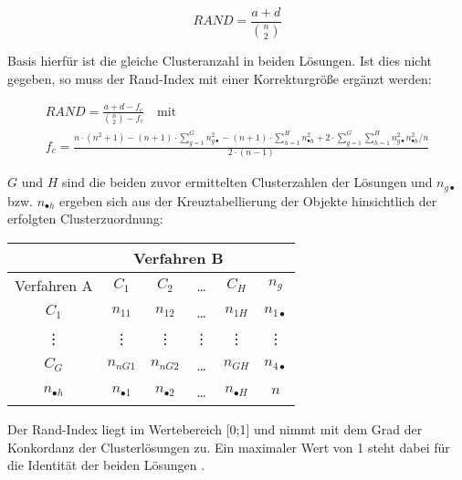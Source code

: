 \begin{equation}
RAND = \frac{a+d}{\binom{n}{2}}
\end{equation}

Basis hierfür ist die gleiche Clusteranzahl in beiden Lösungen. Ist dies nicht gegeben, so muss der Rand-Index mit einer Korrekturgröße ergänzt werden:

 \begin{gather}
 RAND = \frac{a+d-f_c}{\binom{n}{2}-f_c} \quad \text{mit} \\
 f_c = \frac{n\cdot(n^2+1)-(n+1)\cdot\sum_{g=1}^{G}n_{g \bullet}^2-(n+1)\cdot\sum_{h=1}^{H}n_{\bullet h}^2+2\cdot\sum_{g=1}^{G}\sum_{h=1}^{H}n_{g \bullet}^2n_{ \bullet h}^2/n}{2\cdot(n-1)}
 \end{gather}
 
 $G$ und $H$ sind die beiden zuvor ermittelten Clusterzahlen der Lösungen und $n_{g \bullet}$ bzw. $n_{ \bullet h}$ ergeben sich aus der Kreuztabellierung der Objekte hinsichtlich der erfolgten Clusterzuordnung: \\
 
\begin{center}
\begin{tabular}{|c|c|c|c|c|c|} 
	\hline
	& \multicolumn{4}{c|}{Verfahren B} & \\ \hline
	Verfahren A & $C_1$ & $C_2$ & \dots & $C_H$ & $n_g$ \\ \hline
	$C_1$ & $n_{11}$ & $n_{12}$ & \dots & $n_{1H}$ & $n_{1 \bullet}$ \\
	\vdots & \vdots & \vdots & \vdots & \vdots & \vdots \\
	$C_G$ & $n_{nG1}$ & $n_{nG2}$ & \dots & $n_{GH}$ & $n_{4 \bullet}$ \\ \hline
	$n_{\bullet h}$ & $n_{\bullet 1}$ & $n_{\bullet 2}$ & \dots & $n_{\bullet H}$ & $n$ \\ \hline
\end{tabular}
\end{center}
\bigskip

Der Rand-Index liegt im Wertebereich [0;1] und nimmt mit dem Grad der Konkordanz der Clusterlösungen zu. Ein maximaler Wert von 1 steht dabei für die Identität der beiden Lösungen \citep[Vgl.][S. 270-272]{Everitt.2011}. 